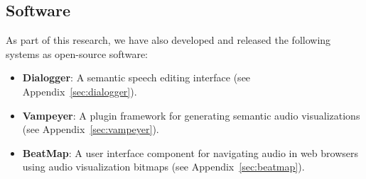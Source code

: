 \subsection*{Software}
As part of this research, we have also developed and released the following systems as open-source software:

\begin{itemize}
  \item \textbf{Dialogger}: A semantic speech editing interface (see Appendix~\ref{sec:dialogger}).
  \item \textbf{Vampeyer}: A plugin framework for generating semantic audio visualizations (see
    Appendix~\ref{sec:vampeyer}).
  \item \textbf{BeatMap}: A user interface component for navigating audio in web browsers using audio visualization
    bitmaps (see Appendix~\ref{sec:beatmap}).
\end{itemize}

